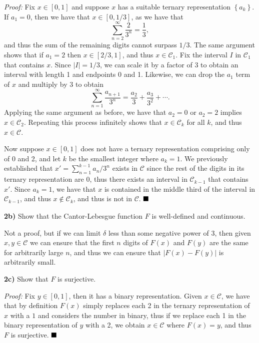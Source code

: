 \documentclass[12pt]{article}
\newcommand{\braceb}  [1]{\ensuremath{\left\{#1\right\}}}
\newcommand{\vertb}   [1]{\ensuremath{\left\vert#1\right\vert}}
\newcommand{\mc}[1]{\ensuremath{\mathcal{#1}}}
\newcommand{\done} {\ensuremath{\strut\hfill\blacksquare}}
\newcommand{\proof}{\textit{Proof: }}
\begin{document}
\proof
Fix \( x \in [0, 1] \) and suppose \( x \) has a suitable ternary
representation \braceb{a_k}.
If \( a_1 = 0 \), then we have that \( x \in [0, 1 / 3] \), as we have that
\[
	\sum_{n = 2}^\infty \frac{2}{3^n} = \frac{1}{3},
\]
and thus the sum of the remaining digits cannot surpass \( 1 / 3 \).
The same argument shows that if \( a_1 = 2 \) then \( x \in [2 / 3, 1] \), and
thus \( x \in \mc{C}_1 \).
Fix the interval \( I \) in \( \mc{C}_1 \) that contains \( x \).
Since \( \vertb{I} = 1 / 3 \), we can scale it by a factor of 3 to obtain an
interval with length 1 and endpoints 0 and 1.
Likewise, we can drop the \( a_1 \) term of \( x \) and multiply by \( 3 \)
to obtain
\[
	\sum_{n = 1}^\infty \frac{a_{n + 1}}{3^n}
	= \frac{a_2}{3} + \frac{a_3}{3^2} + \cdots.
\]
Applying the same argument as before, we have that \( a_2 = 0 \) or
\( a_2 = 2 \) implies \( x \in \mc{C}_2 \).
Repeating this process infinitely shows that \( x \in \mc{C}_k \) for all
\( k \), and thus \( x \in \mc{C} \).

Now suppose \( x \in [0, 1] \) does not have a ternary representation
comprising only of 0 and 2, and let \( k \) be the smallest integer where
\( a_k = 1 \).
We previously established that \( x' = \sum_{n = 1}^{k - 1} a_n / 3^n\) exists
in \( \mc{C} \) since the rest of the digits in its ternary representation are
0, thus there exists an interval in \( \mc{C}_{k - 1} \) that contains
\( x' \).
Since \( a_k = 1 \), we have that \( x \) is contained in the middle third of
the interval in \( \mc{C}_{k - 1} \), and thus \( x \notin \mc{C}_k \), and
thus is not in \( \mc{C} \).
\done

\textbf{2b)} Show that the Cantor-Lebesgue function \( F \) is well-defined and
continuous.

Not a proof, but if we can limit \( \delta \) less than some
negative power of 3, then given \( x, y \in \mc{C} \) we can ensure that the
first \( n \) digits of \( F(x) \) and \( F(y) \) are the same for arbitrarily
large \( n \), and thus we can ensure that \( \vertb{F(x) - F(y)} \) is
arbitrarily small.

\textbf{2c)} Show that \( F \) is surjective.

\proof
Fix \( y \in [0, 1] \), then it has a binary representation.
Given \( x \in \mc{C} \), we have that by definition \( F(x) \) simply replaces
each 2 in the ternary representation of \( x \) with a \( 1 \) and considers
the number in binary, thus if we replace each 1 in the binary representation of
\( y \) with a 2, we obtain \( x \in \mc{C} \) where \( F(x) = y \), and thus
\( F \) is surjective.
\done
\end{document}
